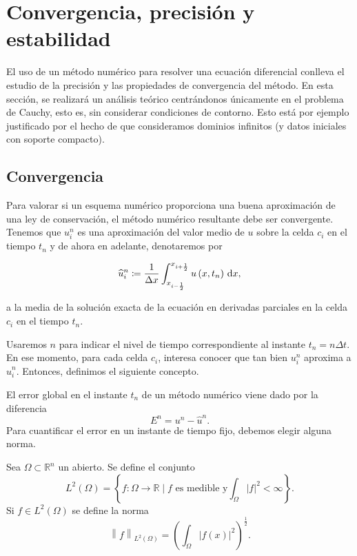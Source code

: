 \chapter{Convergencia, precisión y estabilidad}

El uso de un método numérico para resolver una ecuación diferencial
conlleva el estudio de la precisión y las propiedades de convergencia
del método.
En esta sección, se realizará un análisis teórico centrándonos
únicamente en el problema de Cauchy, esto es, sin considerar
condiciones de contorno.
Esto está por ejemplo justificado por el hecho de que consideramos
dominios infinitos (y datos iniciales con soporte compacto).

\section{Convergencia}

Para valorar si un esquema numérico proporciona una buena
aproximación de una ley de conservación, el método numérico
resultante debe ser convergente.
Tenemos que $u^{n}_{i}$ es una aproximación del valor medio de $u$
sobre la celda $c_{i}$ en el tiempo $t_{n}$ y de ahora en adelante,
denotaremos por

\begin{equation*}
  \widehat{u}^{n}_{i}\coloneqq
  \frac{1}{\Delta x}
  \int_{x_{i-\frac{1}{2}}}^{x_{i+\frac{1}{2}}}
  u\left(x,t_{n}\right)\dl x,
\end{equation*}

a la media de la solución exacta de la ecuación en derivadas
parciales en la celda $c_{i}$ en el tiempo $t_{n}$.

Usaremos $n$ para indicar el nivel de tiempo correspondiente al
instante $t_{n}=n\Delta t$.
En ese momento, para cada celda $c_{i}$, interesa conocer que tan bien $u^{n}_{i}$ aproxima a $\widehat{u}^{n}_{i}$.
Entonces, definimos el siguiente concepto.

\begin{definition}
  El error global en el instante $t_{n}$ de un método numérico viene
  dado por la diferencia
  \begin{equation*}
    E^{n}=u^{n}-\widehat{u}^{n}.
  \end{equation*}
  Para cuantificar el error en un instante de tiempo fijo, debemos elegir alguna norma.
\end{definition}

\begin{definition}
  Sea $\Omega\subset\mathbb{R}^{n}$ un abierto.
  Se define el conjunto
  \begin{equation*}
    L^{2}\left(\Omega\right)=
    \left\{
    f\colon\Omega\to\mathbb{R}\mid
    f\text{ es medible y}
    \int_{\Omega}\left|f\right|^{2}<\infty
    \right\}.
  \end{equation*}
  Si $f\in L^{2}\left(\Omega\right)$ se define la norma
  \begin{equation*}
    {\left\|f\right\|}_{L^{2}\left(\Omega\right)}=
      {\left(
        \int_{\Omega}
        \left|f\left(x\right)\right|^{2}
        \right)}^{\frac{1}{2}}.
  \end{equation*}
\end{definition}

